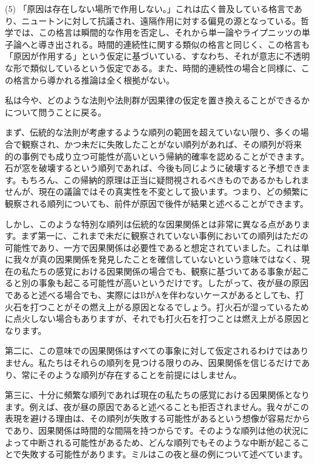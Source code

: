 \documentclass[a4paper,11pt,openany]{ltjsbook}
\begin{document}
(5) 「原因は存在しない場所で作用しない。」これは広く普及している格言であり、ニュートンに対して抗議され、遠隔作用に対する偏見の源となっている。哲学では、この格言は瞬間的な作用を否定し、それから単一論やライプニッツの単子論へと導き出される。時間的連続性に関する類似の格言と同じく、この格言も「原因が作用する」という仮定に基づいている、すなわち、それが意志に不透明な形で類似しているという仮定である。また、時間的連続性の場合と同様に、この格言から導かれる推論は全く根拠がない。

私は今や、どのような法則や法則群が因果律の仮定を置き換えることができるかについて問うことに戻る。

まず、伝統的な法則が考慮するような順列の範囲を超えていない限り、多くの場合で観察され、かつ未だに失敗したことがない順列があれば、その順列が将来的の事例でも成り立つ可能性が高いという帰納的確率を認めることができます。石が窓を破壊するという順列であれば、今後も同じように破壊すると予想できます。もちろん、この帰納的原理は正当に疑問視されるべきものであるかもしれませんが、現在の議論ではその真実性を不変として扱います。つまり、どの頻繁に観察される順列についても、前件が原因で後件が結果と述べることができます。

しかし、このような特別な順列は伝統的な因果関係とは非常に異なる点があります。まず第一に、これまで未だに観察されていない事例においての順列はただの可能性であり、一方で因果関係は必要性であると想定されていました。これは単に我々が真の因果関係を発見したことを確信していないという意味ではなく、現在の私たちの感覚における因果関係の場合でも、観察に基づいてある事象が起こると別の事象も起こる可能性が高いというだけです。したがって、夜が昼の原因であると述べる場合でも、実際にはBがAを伴わないケースがあるとしても、打火石を打つことがその燃え上がる原因となるでしょう。打火石が湿っているために点火しない場合もありますが、それでも打火石を打つことは燃え上がる原因となります。

第二に、この意味での因果関係はすべての事象に対して仮定されるわけではありません。私たちはそれらの順列を見つける限りのみ、因果関係を信じるだけであり、常にそのような順列が存在することを前提にはしません。

第三に、十分に頻繁な順列であれば現在の私たちの感覚における因果関係となります。例えば、夜が昼の原因であると述べることも拒否されません。我々がこの表現を避ける理由は、その順列が失敗する可能性があるという想像が容易だからであり、因果関係は時間的な間隔を持つからです。そのような順列は他の状況によって中断される可能性があるため、どんな順列でもそのような中断が起こることで失敗する可能性があります。ミルはこの夜と昼の例について述べています。
\end{document}
